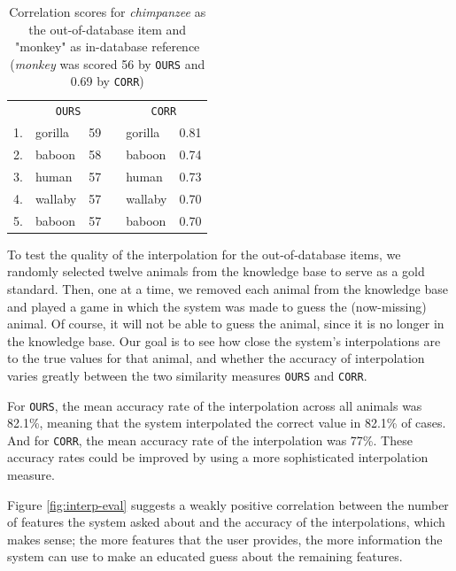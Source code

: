 \documentclass[11pt,a4paper]{article}
\begin{document}
\begin{table}[h]
    \centering
    \begin{tabular}{clcclc}
    \toprule
    & \multicolumn{2}{c}{\texttt{OURS}} && \multicolumn{2}{c}{\texttt{CORR}} \\
    \cmidrule{2-3} \cmidrule{5-6}
    1. & gorilla & 59 && gorilla & 0.81 \\
    2. & baboon & 58 && baboon & 0.74 \\
    3. & human & 57 && human & 0.73 \\
    4. & wallaby & 57 && wallaby & 0.70 \\
    5. & baboon & 57 && baboon & 0.70 \\
    \bottomrule
    \end{tabular}
\caption{Correlation scores for \textit{chimpanzee} as the out-of-database item and "monkey" as in-database reference (\textit{monkey} was scored 56 by \texttt{OURS} and 0.69 by \texttt{CORR})}
\label{tab:corr2}
\end{table}


To test the quality of the interpolation for the out-of-database items, we randomly selected twelve animals from the knowledge base to serve as a gold standard.
Then, one at a time, we removed each animal from the knowledge base and played a game in which the system was made to guess the (now-missing) animal. 
Of course, it will not be able to guess the animal, since it is no longer in the knowledge base.
Our goal is to see how close the system's interpolations are to the true values for that animal, and whether the accuracy of interpolation varies greatly between the two similarity measures \texttt{OURS} and \texttt{CORR}.

For \texttt{OURS}, the mean accuracy rate of the interpolation across all animals was 82.1\%, meaning that the system interpolated the correct value in 82.1\% of cases.
And for \texttt{CORR}, the mean accuracy rate of the interpolation was 77\%.
These accuracy rates could be improved by using a more sophisticated interpolation measure.

Figure \ref{fig:interp-eval} suggests a weakly positive correlation between the number of features the system asked about and the accuracy of the interpolations, which makes sense; the more features that the user provides, the more information the system can use to make an educated guess about the remaining features.
\end{document}
